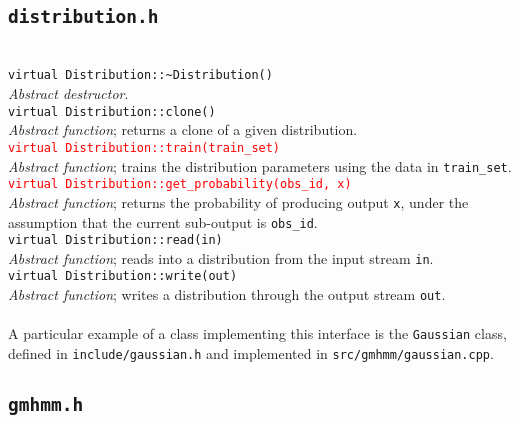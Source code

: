 \documentclass[12pt,openany]{article}
\newcommand{\fundef}[1]{\\\indent\indent\texttt{#1}\\}
\begin{document}
	\subsection{\tt distribution.h}\label{sec:disthdr}
	\hfill\vspace*{-10pt}\fundef{virtual Distribution::\textasciitilde Distribution()}
	\emph{Abstract destructor}.
	\fundef{virtual Distribution::clone()}
	\emph{Abstract function}; returns a clone of a given distribution.
	\textcolor{red}{\fundef{virtual Distribution::train(train\_set)}}
	\emph{Abstract function}; trains the distribution parameters using the data in {\tt train\_set}.
	\textcolor{red}{\fundef{virtual Distribution::get\_probability(obs\_id, x)}}
	\emph{Abstract function}; returns the probability of producing output {\tt x}, under the assumption that the current sub-output is {\tt obs\_id}.
	\fundef{virtual Distribution::read(in)}
	\emph{Abstract function}; reads into a distribution from the input stream {\tt in}.
	\fundef{virtual Distribution::write(out)}
	\emph{Abstract function}; writes a distribution through the output stream {\tt out}.\\ \\
	A particular example of a class implementing this interface is the {\tt Gaussian} class, defined in {\tt include/gaussian.h} and implemented in {\tt src/gmhmm/gaussian.cpp}.
	
	\subsection{\tt gmhmm.h}
	
\end{document}
